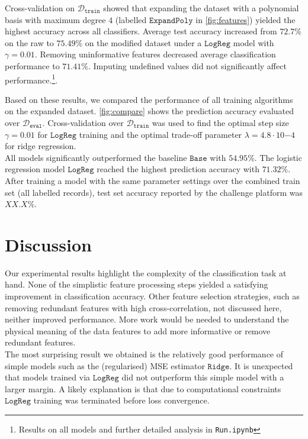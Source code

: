 \documentclass[10pt,conference,compsocconf]{IEEEtran}
\newcommand{\Deval}{\mathcal{D}_{\mathtt{eval}}}
\newcommand{\Dtrain}{\mathcal{D}_{\mathtt{train}}}
\newcommand{\Baseline}{\mathtt{Base}}
\newcommand{\Ridge}{\mathtt{Ridge}}
\newcommand{\LogReg}{\mathtt{LogReg}}
\begin{document}
Cross-validation on $\Dtrain$ showed that expanding the dataset with a polynomial basis with maximum degree $4$ (labelled $\mathtt{ExpandPoly}$ in \autoref{fig:features}) yielded the highest accuracy across all classifiers. Average test accuracy increased from $72.7\%$ on the raw to $75.49\%$ on the modified dataset under a $\LogReg$ model with $\gamma = 0.01$. Removing uninformative features decreased average classification performance to $71.41\%$. Imputing undefined values did not significantly affect performance.\footnote{Results on all models and further detailed analysis in \texttt{Run.ipynb}}.

Based on these results, we compared the performance of all training algorithms on the expanded dataset. \autoref{fig:compare} shows the prediction accuracy evaluated over $\Deval$. Cross-validation over $\Dtrain$ was used to find the optimal step size $\gamma=0.01$ for $\LogReg$ training and the optimal trade-off parameter $\lambda=4.8 \cdot 10{-4}$ for ridge regression.\\
All models significantly outperformed the baseline $\Baseline$ with $54.95\%$. The logistic regression model $\LogReg$ reached the highest prediction accuracy with $71.32\%$. After training a model with the same parameter settings over the combined train set (all labelled records), test set accuracy reported by the challenge platform was $XX.X\%$. 

\vspace*{-2mm}
\section{Discussion}
Our experimental results highlight the complexity of the classification task at hand. None of the simplistic feature processing steps yielded a satisfying improvement in classification accuracy. Other feature selection strategies, such as removing redundant features with high cross-correlation, not discussed here, neither improved performance.
More work would be needed to understand the physical meaning of the data features to add more informative or remove redundant features.\\
The most surprising result we obtained is the relatively good performance of simple models such as the (regularised) MSE estimator $\Ridge$. It is unexpected that models trained via $\LogReg$ did not outperform this simple model with a larger margin. A likely explanation is that due to computational constraints $\LogReg$ training was terminated before  loss convergence.



\end{document}
